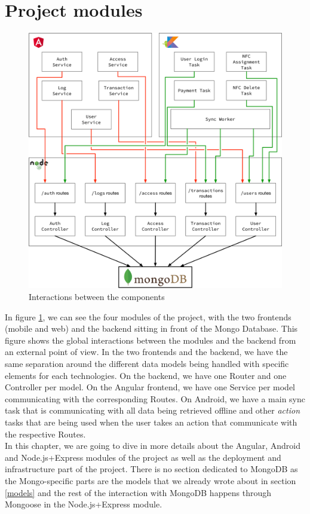 \documentclass[twoside, openright,11pt,a4paper]{book}
\begin{document}
\section{Project modules}
\begin{figure}[H]
\begin{center}
	\includegraphics[width=.9\textwidth]{assets/implementation}
	\caption{Interactions between the components}
	\label{all_modules_fig}
\end{center}
\end{figure}
In figure \ref{all_modules_fig}, we can see the four modules of the project, with the two frontends (mobile and web) and the backend sitting in front of the Mongo Database. This figure shows the global interactions between the modules and the backend from an external point of view. In the two frontends and the backend, we have the same separation around the different data models being handled with specific elements for each technologies. On the backend, we have one Router and one Controller per model. On the Angular frontend, we have one Service per model communicating with the corresponding Routes. On Android, we have a main sync task that is communicating with all data being retrieved offline and other \emph{action} tasks that are being used when the user takes an action that communicate with the respective Routes.\\

In this chapter, we are going to dive in more details about the Angular, Android and Node.js+Express modules of the project as well as the deployment and infrastructure part of the project. There is no section dedicated to MongoDB as the Mongo-specific parts are the models that we already wrote about in section \ref{models} and the rest of the interaction with MongoDB happens through Mongoose in the Node.js+Express module.
\end{document}
